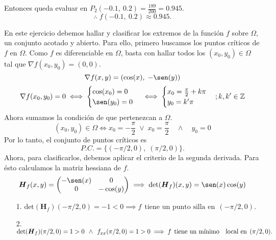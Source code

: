 \begin{solution}
    Entonces queda evaluar en $P_2\left(-0\text{.}1,\:0\text{.}2\right) = \frac{189}{200} = 0\text{.}945$.
    $$\therefore\;f\left(-0\text{.}1,\:0\text{.}2\right)\approx0\text{.}945.$$
\end{solution}

\begin{solution}
    En este ejercicio debemos hallar y clasificar los extremos de la función $f$ sobre $\Omega$,  un conjunto acotado y abierto.
    Para ello,    primero buscamos los puntos críticos de $f$ en $\Omega$. Como $f$ es diferenciable en  $\Omega$, basta con hallar todos los $(x_0,y_0) \in  \Omega$ tal que $\nabla f(x_0,y_0)=(0,0).$
    \[
        \nabla f(x,y)=\left(\cos(x),\;-\sen(y)\right)
    \]
    \[
        \nabla f(x_0,y_0) =0 \iff \begin{cases}
            \cos(x_0)=0 \\ \sen(y_0)=0
        \end{cases} \iff \begin{cases}
            x_0 = \frac{\pi}{2}+k\pi \\
            y_0 = k'\pi
        \end{cases};k,k'\in\mathbb{Z}
    \]
    Ahora sumamos la condición de que pertenezcan a $\Omega$.
    \[
        (x_0,y_0)\in\Omega\iff x_0=-\frac{\pi}{2}\;\lor\;x_0=\frac{\pi}{2}\quad\land\quad y_0=0
    \]
    Por lo tanto,  el conjunto de puntos críticos es
    \[
        P.C.=\{(-\pi/2,0),\;(\pi/2,0)\}.
    \]
    Ahora, para clasificarlos, debemos aplicar el criterio de la segunda derivada. Para ésto calculamos la matriz hessiana de $f$.
    \[
        \boldsymbol{H}_f(x,y)=\left(\begin{matrix}
                -\sen(x) & 0 \\ 0 & -\cos(y)
            \end{matrix}\right)\implies \text{det}(\boldsymbol{H}_f)(x,y)=\sen(x)\cos(y)
    \]

    \begin{itemize}
        \item[1.] $\text{det}(\boldsymbol{H}_f)(-\pi/2,0)=-1<0 \implies f\:\:\text{tiene un punto silla en}\:\: (-\pi/2,0).$
        \item[2.] $\text{det}(\boldsymbol{H}_f)(\pi/2,0)=1>0 \:\:\land\:\: f_{xx}(\pi/2,0)=1>0\implies f\:\:\text{tiene un mínimo} \\
                  \quad \text{local en}\:\:(\pi/2,0).$
    \end{itemize}
\end{solution}
